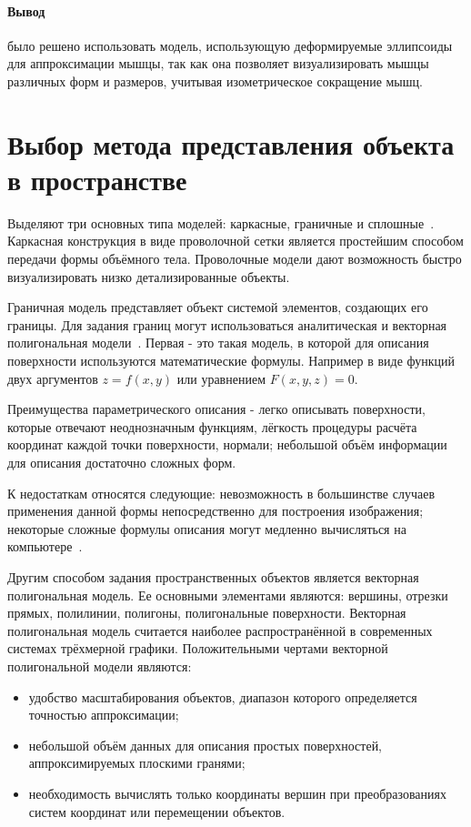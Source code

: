 \paragraph{Вывод} было решено использовать модель, использующую деформируемые эллипсоиды для аппроксимации мышцы, так как она позволяет визуализировать мышцы различных форм и размеров, учитывая изометрическое сокращение мышц.

\section{Выбор метода представления объекта в пространстве}
\label{sec:model_meth} 
Выделяют три основных типа моделей: каркасные, граничные и сплошные~\cite{nikulin}. Каркасная конструкция в виде проволочной сетки является простейшим способом передачи формы объёмного тела. Проволочные модели дают возможность быстро визуализировать низко детализированные объекты.
\par Граничная модель представляет объект системой элементов, создающих его границы. Для задания границ могут использоваться аналитическая и векторная полигональная модели~\cite{porev}. Первая - это такая модель, в которой для описания поверхности используются математические формулы. Например в виде функций двух аргументов $ z = f(x, y)$ или уравнением $F(x, y, z) = 0$.
\par Преимущества параметрического описания - легко описывать поверхности, которые отвечают неоднозначным функциям, лёгкость процедуры расчёта координат каждой точки поверхности, нормали; небольшой объём информации для описания достаточно сложных форм.
\par К недостаткам относятся следующие: невозможность в большинстве случаев применения данной формы непосредственно для построения изображения; некоторые сложные формулы описания могут медленно вычисляться на компьютере~\cite{porev}.
\par Другим способом задания пространственных объектов является векторная полигональная модель. Ее основными элементами являются: вершины, отрезки прямых, полилинии, полигоны, полигональные поверхности. Векторная полигональная модель считается наиболее распространённой в современных системах трёхмерной графики. Положительными чертами векторной полигональной модели являются:
\begin{itemize}
	\item удобство масштабирования объектов, диапазон которого определяется точностью аппроксимации;
	\item небольшой объём данных для описания простых поверхностей, аппроксимируемых плоскими гранями;
	\item необходимость вычислять только координаты вершин при преобразованиях систем координат или перемещении объектов.
\end{itemize}
